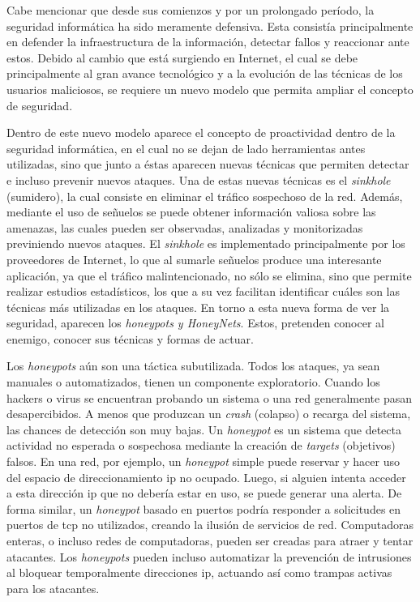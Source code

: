 \documentclass[a4paper,12pt]{report}
\begin{document}
Cabe mencionar que desde sus comienzos y por un prolongado período, la
seguridad informática ha sido meramente defensiva. Esta consistía
principalmente en defender la infraestructura de la información,
detectar fallos y reaccionar ante estos. Debido al cambio que está
surgiendo en Internet, el cual se debe principalmente al gran avance
tecnológico y a la evolución de las técnicas de los usuarios maliciosos,
se requiere un nuevo modelo que permita ampliar el concepto de seguridad. \cite{delaetcisco}

Dentro de este nuevo modelo aparece el concepto de proactividad dentro
de la seguridad informática, en el cual no se dejan de lado herramientas
antes utilizadas, sino que junto a éstas aparecen nuevas técnicas que
permiten detectar e incluso prevenir nuevos ataques. Una de estas nuevas
técnicas es el \emph{sinkhole} (sumidero), la cual
consiste en eliminar el tráfico sospechoso de la red. Además, mediante el uso de
señuelos se puede obtener información valiosa sobre las amenazas, las
cuales pueden ser observadas, analizadas y monitorizadas previniendo
nuevos ataques. El \emph{sinkhole} es implementado principalmente por los
proveedores de Internet, lo que al sumarle señuelos produce una
interesante aplicación, ya que el tráfico malintencionado, no sólo se
elimina, sino que permite realizar estudios estadísticos, los que a su
vez facilitan identificar cuáles son las técnicas más utilizadas en los
ataques. En torno a esta nueva forma de ver la seguridad, aparecen los
\emph{honeypots y
HoneyNets}. Estos, pretenden conocer al enemigo, conocer sus técnicas y
formas de actuar. \cite{trapp} 

Los \emph{honeypots} aún son una táctica subutilizada. Todos los ataques, ya
sean manuales o \mbox{automatizados}, tienen un componente exploratorio. Cuando los
hackers o virus se encuentran probando un sistema o una red generalmente
pasan desapercibidos. A menos que produzcan un \emph{crash} (colapso) o
recarga del sistema, las chances de detección son muy bajas. Un \emph{honeypot}
es un sistema que detecta actividad no esperada o sospechosa mediante la 
creación de \emph{targets} (objetivos) falsos. En una red, por ejemplo, un
\emph{honeypot} simple puede reservar y hacer uso del espacio de direccionamiento \ac{ip}
no ocupado. Luego, si alguien intenta acceder a esta dirección \ac{ip} que no debería
estar en uso, se puede generar una alerta. De forma similar, un \emph{honeypot} basado en 
puertos podría responder a solicitudes en puertos de \ac{tcp} no utilizados, creando
la ilusión de servicios de red. Computadoras enteras, o incluso redes de computadoras,
pueden ser creadas para atraer y tentar atacantes. Los \emph{honeypots} pueden incluso
automatizar la prevención de intrusiones al bloquear temporalmente direcciones \ac{ip},
actuando así como trampas activas para los atacantes.
\end{document}
